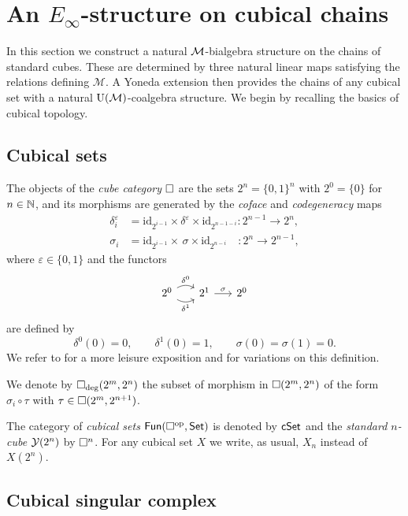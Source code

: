 
\section{An \texorpdfstring{${E_\infty}$}{E-infty}-structure on cubical chains} \label{s:action}

In this section we construct a natural $\mathcal{M}$-bialgebra structure on the chains of standard cubes.
These are determined by three natural linear maps satisfying the relations defining $\mathcal M$.
A Yoneda extension then provides the chains of any cubical set with a natural ${\operatorname{U}(\mathcal{M})}$-coalgebra structure.
We begin by recalling the basics of cubical topology.

\subsection{Cubical sets}

The objects of the \textit{cube category} $\square$ are the sets $2^n = \{0, 1\}^n$ with $2^0 = \{0\}$ for $n \in \mathbb{N}$, and its morphisms are generated by the \textit{coface} and \textit{codegeneracy} maps
\begin{align*}
\delta_i^\varepsilon & = \mathrm{id}_{2^{i-1}} \times \delta^\varepsilon \times \mathrm{id}_{2^{n-1-i}} \colon 2^{n-1} \to 2^n, \\
\sigma_i & = \mathrm{id}_{2^{i-1}} \times \, \sigma \times \mathrm{id}_{2^{n-i}} \quad \colon 2^{n} \to 2^{n-1},
\end{align*}
where $\varepsilon \in \{0,1\}$ and the functors
\[
\begin{tikzcd} [column sep=16pt]
2^0 \arrow[r, bend left, "\delta^0"] \arrow[r, bend right, "\delta^1"'] & 2^1 \arrow[r, "\sigma"] & 2^0
\end{tikzcd}
\]
are defined by
\[
\delta^0(0) = 0, \qquad \delta^1(0) = 1, \qquad \sigma(0) = \sigma(1) = 0.
\]
We refer to \cite{grandis2003cubical} for a more leisure exposition and for variations on this definition.

We denote by $\square_{\deg}(2^m, 2^n)$ the subset of morphism in $\square(2^m, 2^n)$ of the form $\sigma_i \circ \tau$ with $\tau \in \square(2^m, 2^{n+1})$.

The category of \textit{cubical sets} $\mathsf{Fun}(\square^{\mathrm{op}}, \mathsf{Set})$ is denoted by $\mathsf{cSet}$ and the \textit{standard $n$-cube} $\operatorname{\mathcal{Y}}(2^n)$ by $\square^n$.
For any cubical set $X$ we write, as usual, $X_n$ instead of $X(2^n)$.

\subsection{Cubical singular complex}

